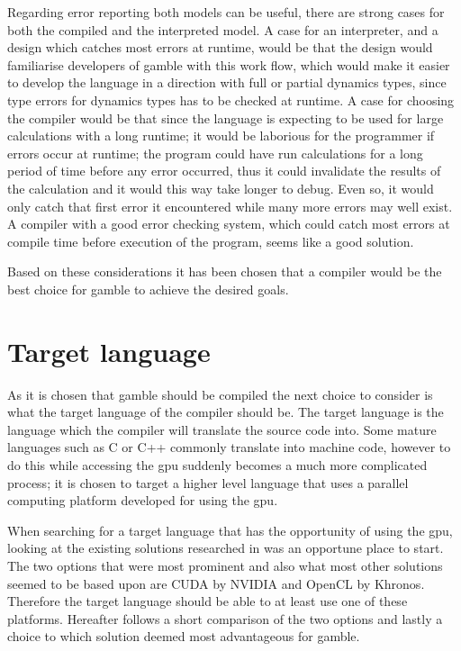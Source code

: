 Regarding error reporting both models can be useful, there are strong cases for both the compiled and the interpreted model.
A case for an interpreter, and a design which catches most errors at runtime, would be that the design would familiarise developers of \gls{gamble} with this work flow, which would make it easier to develop the language in a direction with full or partial dynamics types, since type errors for dynamics types has to be checked at runtime. 
A case for choosing the compiler would be that since the language is expecting to be used for large calculations with a long runtime; it would be laborious for the programmer if errors occur at runtime; the program could have run calculations for a long period of time before any error occurred, thus it could invalidate the results of the calculation and it would this way take longer to debug.
Even so, it would only catch that first error it encountered while many more errors may well exist.
A compiler with a good error checking system, which could catch most errors at compile time before execution of the program, seems like a good solution.\citep{Sebesta, Crafting_book}

Based on these considerations it has been chosen that a compiler would be the best choice for \gls{gamble} to achieve the desired goals.

\section{Target language}\label{CUDAvsOpenCL}
As it is chosen that \gls{gamble} should be compiled the next choice to consider is what the target language of the compiler should be.
The target language is the language which the compiler will translate the source code into.
Some mature languages such as C or C++ commonly translate into machine code, however to do this while accessing the \acrshort{gpu} suddenly becomes a much more complicated process; it is chosen to target a higher level language that uses a parallel computing platform developed for using the \acrshort{gpu}.

When searching for a target language that has the opportunity of using the \acrshort{gpu}, looking at the existing solutions researched in  was an opportune place to start.
The two options that were most prominent and also what most other solutions seemed to be based upon are CUDA by NVIDIA and OpenCL by Khronos.
Therefore the target language should be able to at least use one of these platforms. 
Hereafter follows a short comparison of the two options and lastly a choice to which solution deemed most advantageous for \gls{gamble}.

